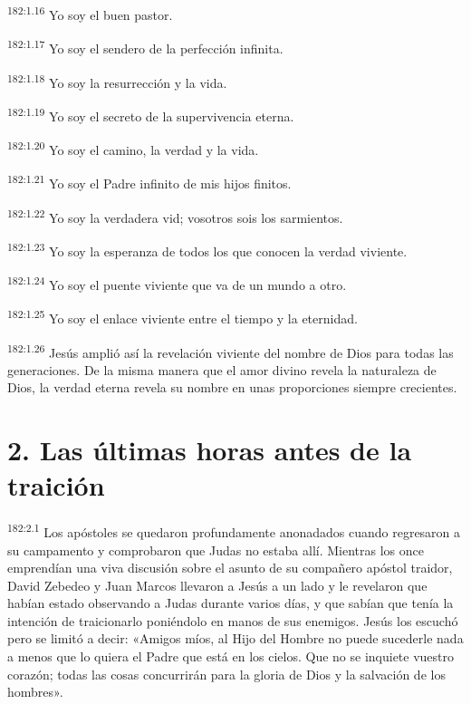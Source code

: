 \par 
\textsuperscript{182:1.16} Yo soy el buen pastor.

\par 
\textsuperscript{182:1.17} Yo soy el sendero de la perfección infinita.

\par 
\textsuperscript{182:1.18} Yo soy la resurrección y la vida.

\par 
\textsuperscript{182:1.19} Yo soy el secreto de la supervivencia eterna.

\par 
\textsuperscript{182:1.20} Yo soy el camino, la verdad y la vida.

\par 
\textsuperscript{182:1.21} Yo soy el Padre infinito de mis hijos finitos.

\par 
\textsuperscript{182:1.22} Yo soy la verdadera vid; vosotros sois los sarmientos.

\par 
\textsuperscript{182:1.23} Yo soy la esperanza de todos los que conocen la verdad viviente.

\par 
\textsuperscript{182:1.24} Yo soy el puente viviente que va de un mundo a otro.

\par 
\textsuperscript{182:1.25} Yo soy el enlace viviente entre el tiempo y la eternidad.

\par 
\textsuperscript{182:1.26} Jesús amplió así la revelación viviente del nombre de Dios para todas las generaciones. De la misma manera que el amor divino revela la naturaleza de Dios, la verdad eterna revela su nombre en unas proporciones siempre crecientes.

\section*{2. Las últimas horas antes de la traición}
\par 
\textsuperscript{182:2.1} Los apóstoles se quedaron profundamente anonadados cuando regresaron a su campamento y comprobaron que Judas no estaba allí. Mientras los once emprendían una viva discusión sobre el asunto de su compañero apóstol traidor, David Zebedeo y Juan Marcos llevaron a Jesús a un lado y le revelaron que habían estado observando a Judas durante varios días, y que sabían que tenía la intención de traicionarlo poniéndolo en manos de sus enemigos. Jesús los escuchó pero se limitó a decir: «Amigos míos, al Hijo del Hombre no puede sucederle nada a menos que lo quiera el Padre que está en los cielos. Que no se inquiete vuestro corazón; todas las cosas concurrirán para la gloria de Dios y la salvación de los hombres».

